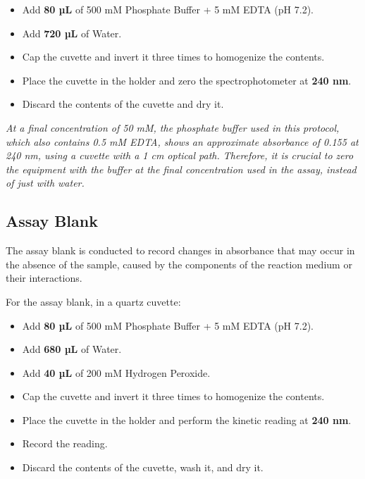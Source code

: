\documentclass[
  9pt,
  american,
  a5paper,
  extrafontsizes,onecolumn,openright
  ]{memoir}
\providecommand{\tightlist}{%
  \setlength{\itemsep}{0pt}\setlength{\parskip}{0pt}}
\newlength{\rf}
\begin{document}
\begin{itemize}
\tightlist
\item
  Add \textbf{80 µL} of 500 mM Phosphate Buffer + 5 mM EDTA (pH 7.2).
\item
  Add \textbf{720 µL} of Water.
\item
  Cap the cuvette and invert it three times to homogenize the contents.
\item
  Place the cuvette in the holder and zero the spectrophotometer at \textbf{240 nm}.
\item
  Discard the contents of the cuvette and dry it.
\end{itemize}

\begin{greybox}[frametitle = Note]
\emph{At a final concentration of 50 mM, the phosphate buffer used in this protocol, which also contains 0.5 mM EDTA, shows an approximate absorbance of 0.155 at 240 nm, using a cuvette with a 1 cm optical path. Therefore, it is crucial to zero the equipment with the buffer at the final concentration used in the assay, instead of just with water.}

\end{greybox}

\subsection{Assay Blank}\label{cat_assay_blank}

The assay blank is conducted to record changes in absorbance that may occur in the absence of the sample, caused by the components of the reaction medium or their interactions.

For the assay blank, in a quartz cuvette:

\begin{itemize}
\tightlist
\item
  Add \textbf{80 µL} of 500 mM Phosphate Buffer + 5 mM EDTA (pH 7.2).
\item
  Add \textbf{680 µL} of Water.
\item
  Add \textbf{40 µL} of 200 mM Hydrogen Peroxide.
\item
  Cap the cuvette and invert it three times to homogenize the contents.
\item
  Place the cuvette in the holder and perform the kinetic reading at \textbf{240 nm}.
\item
  Record the reading.
\item
  Discard the contents of the cuvette, wash it, and dry it.
\end{itemize}
\end{document}
